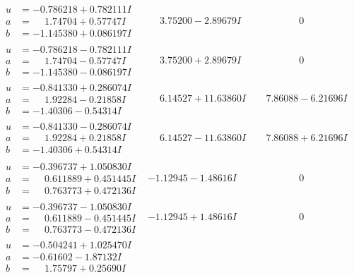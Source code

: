 \documentclass[1p]{elsarticle_modified}
\theoremstyle{definition}
\begin{document}
$$\begin{array}{c|c|c}
\begin{aligned}
u &= -0.786218 + 0.782111 I \\
a &= \phantom{-}1.74704 + 0.57747 I \\
b &= -1.145380 + 0.086197 I\end{aligned}
 & \phantom{-}3.75200 - 2.89679 I & \phantom{-0.000000 } 0 \\ \hline\begin{aligned}
u &= -0.786218 - 0.782111 I \\
a &= \phantom{-}1.74704 - 0.57747 I \\
b &= -1.145380 - 0.086197 I\end{aligned}
 & \phantom{-}3.75200 + 2.89679 I & \phantom{-0.000000 } 0 \\ \hline\begin{aligned}
u &= -0.841330 + 0.286074 I \\
a &= \phantom{-}1.92284 - 0.21858 I \\
b &= -1.40306 - 0.54314 I\end{aligned}
 & \phantom{-}6.14527 + 11.63860 I & \phantom{-}7.86088 - 6.21696 I \\ \hline\begin{aligned}
u &= -0.841330 - 0.286074 I \\
a &= \phantom{-}1.92284 + 0.21858 I \\
b &= -1.40306 + 0.54314 I\end{aligned}
 & \phantom{-}6.14527 - 11.63860 I & \phantom{-}7.86088 + 6.21696 I \\ \hline\begin{aligned}
u &= -0.396737 + 1.050830 I \\
a &= \phantom{-}0.611889 + 0.451445 I \\
b &= \phantom{-}0.763773 + 0.472136 I\end{aligned}
 & -1.12945 - 1.48616 I & \phantom{-0.000000 } 0 \\ \hline\begin{aligned}
u &= -0.396737 - 1.050830 I \\
a &= \phantom{-}0.611889 - 0.451445 I \\
b &= \phantom{-}0.763773 - 0.472136 I\end{aligned}
 & -1.12945 + 1.48616 I & \phantom{-0.000000 } 0 \\ \hline\begin{aligned}
u &= -0.504241 + 1.025470 I \\
a &= -0.61602 - 1.87132 I \\
b &= \phantom{-}1.75797 + 0.25690 I\end{aligned}

\end{array}$$
\end{document}
